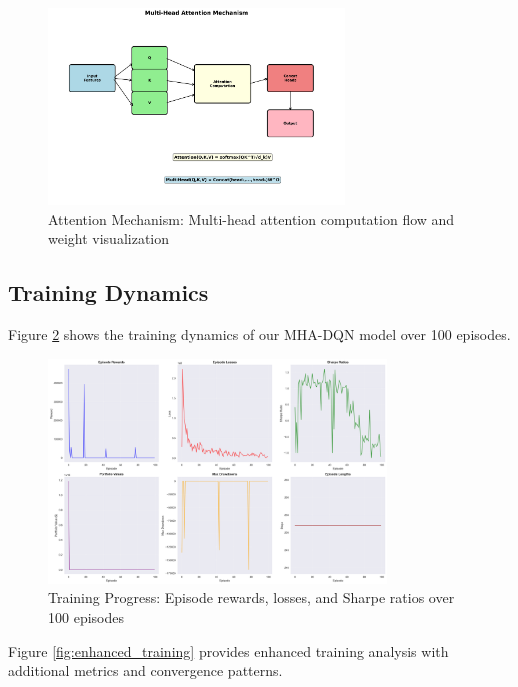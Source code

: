 \documentclass[11pt]{article}
\begin{document}
\begin{figure}[H]
\centering
\includegraphics[width=0.7\textwidth]{figures/attention_mechanism.png}
\caption{Attention Mechanism: Multi-head attention computation flow and weight visualization}
\label{fig:attention_mechanism}
\end{figure}

\subsection{Training Dynamics}

Figure \ref{fig:training_progress} shows the training dynamics of our MHA-DQN model over 100 episodes.

\begin{figure}[H]
\centering
\includegraphics[width=0.8\textwidth]{figures/training_training_progress.png}
\caption{Training Progress: Episode rewards, losses, and Sharpe ratios over 100 episodes}
\label{fig:training_progress}
\end{figure}

Figure \ref{fig:enhanced_training} provides enhanced training analysis with additional metrics and convergence patterns.
\end{document}
